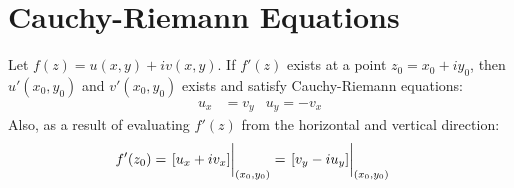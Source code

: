\documentclass[12pt, english]{book}
\begin{document}
	
	\section{Cauchy-Riemann Equations} \label{Cauchy-Riemann Equations Section - Complex}
	\begin{theorem} 
		\label{Cauchy-Riemann Equations (Cartesian) Theorem - Complex}
		Let \( f(z) = u(x, y) + iv(x,y) \).
		If \(f'(z)\) exists at a point \(z_0 = x_0 + iy_0\), then \(u'(x_0, y_0)\) and \(v'(x_0, y_0)\) exists and satisfy Cauchy-Riemann equations:
		\begin{align*}
			u_x &= v_y	&	u_y = -v_x
		\end{align*}
		Also, as a result of evaluating \(f'(z)\) from the horizontal and vertical direction:
		\begin{align*}
			f'(z_0) &= \eval{[u_x + iv_x]}_{(x_0, y_0)} 
					 = \eval{[v_y - i u_y]}_{(x_0, y_0)}
		\end{align*}
	\end{theorem}
\end{document}
